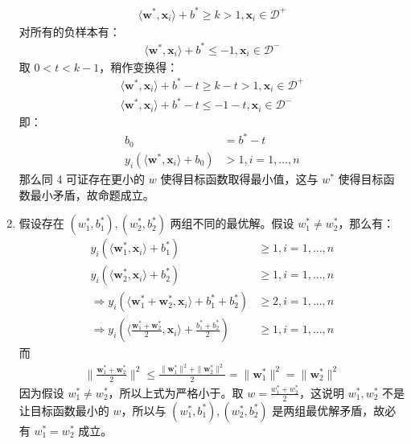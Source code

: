 \documentclass[11pt,letter,notitlepage]{article}
\begin{document}
\begin{solution}
\begin{enumerate}
		\begin{align*}
			\langle \textbf{w}^{*}, \textbf{x}_i \rangle + b^{*}  \geqslant k > 1, \textbf{x}_i \in \mathcal{D}^+
		\end{align*}
		对所有的负样本有：
		\begin{align*}
			\langle \textbf{w}^{*}, \textbf{x}_i \rangle + b^{*}  \leqslant -1, \textbf{x}_i \in \mathcal{D}^-
		\end{align*}
		取 $0 < t < k - 1$，稍作变换得：
		\begin{align*}
			\langle \textbf{w}^{*}, \textbf{x}_i \rangle + b^{*} - t  \geqslant k - t > 1, \textbf{x}_i \in \mathcal{D}^+\\
			\langle \textbf{w}^{*}, \textbf{x}_i \rangle + b^{*} - t  \leqslant -1 - t, \textbf{x}_i \in \mathcal{D}^-
		\end{align*}
		即：
		\begin{align*}
			b_0 &= b^{*} - t\\
			y_{i} ( \langle \textbf{w}^{*}, \textbf{x}_i \rangle + b_0 ) &> 1, i = 1,\ldots,n
		\end{align*}
		那么同 4 可证存在更小的 $w$ 使得目标函数取得最小值，这与 $w^*$ 使得目标函数最小矛盾，故命题成立。
		\item 假设存在 $(w_1^*,b_1^*), (w_2^*, b_2^*)$ 两组不同的最优解。假设 $w_1^* \neq w_2^*$，那么有：
		\begin{align*}
			y_{i} ( \langle \textbf{w}_1^{*}, \textbf{x}_i \rangle + b_1^* ) &\geqslant 1, i = 1,\ldots,n\\
			y_{i} ( \langle \textbf{w}_2^{*}, \textbf{x}_i \rangle + b_2^* ) &\geqslant 1, i = 1,\ldots,n\\
			\Rightarrow y_{i} ( \langle \textbf{w}_1^{*} + \textbf{w}_2^{*}, \textbf{x}_i \rangle + b_1^* + b_2^* ) &\geqslant 2, i = 1,\ldots,n\\
			\Rightarrow y_{i} ( \langle \frac{\textbf{w}_1^{*} + \textbf{w}_2^{*}}{2}, \textbf{x}_i \rangle + \frac{b_1^* + b_2^*}{2} ) &\geqslant 1, i = 1,\ldots,n
		\end{align*}
		而
		\begin{align*}
			\| \frac{\textbf{w}_1^{*} + \textbf{w}_2^{*}}{2} \|^2 \leqslant \frac{\| \textbf{w}_1^*\|^2 + \|\textbf{w}_2^* \|^2}{2} =  \|\textbf{w}_1^* \|^2 = \|\textbf{w}_2^* \|^2
		\end{align*}
		因为假设 $w_1^* \neq w_2^*$，所以上式为严格小于。取 $w = \frac{{w}_1^{*} + {w}_2^{*}}{2}$，这说明 $w_1^*, w_2^*$ 不是让目标函数最小的 $w$，所以与 $(w_1^*,b_1^*), (w_2^*, b_2^*)$ 是两组最优解矛盾，故必有 $w_1^* = w_2^*$ 成立。\\

\end{enumerate}
\end{solution}
\end{document}

